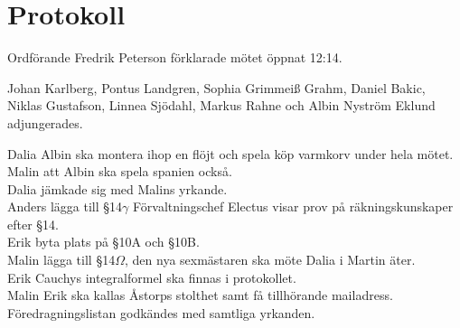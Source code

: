 \documentclass[10pt]{article}
\def\mo{Fredrik Peterson}
\begin{document}
\section*{Protokoll}
\begin{paragrafer}
Ordförande {\mo} förklarade mötet öppnat 12:14.

{\valavmo}

{\valavms}

{\tosg}

Johan Karlberg, Pontus Landgren, Sophia Grimmei{\ss} Grahm, Daniel Bakic, Niklas Gustafson, Linnea Sjödahl, Markus Rahne och Albin Nyström Eklund adjungerades.


{\valavj}

Dalia \ypa Albin ska montera ihop en flöjt och spela köp varmkorv under hela mötet.\\
Malin \ypa att Albin ska spela spanien också.\\
Dalia jämkade sig med Malins yrkande.\\
Anders \ypa lägga till \S14$\gamma$ Förvaltningschef Electus visar prov på räkningskunskaper efter \S14. \\
Erik \ypa byta plats på \S10A och \S10B. \\
Malin \ypa lägga till \S14$\Omega$, den nya sexmästaren ska möte Dalia i Martin äter.\\
Erik \ypa Cauchys integralformel ska finnas i protokollet.\\
Malin \ypa Erik ska kallas Åstorps stolthet samt få tillhörande mailadress.\\
Föredragningslistan godkändes med samtliga yrkanden.

\begin{fyllnadsval} %
\end{fyllnadsval}


\end{paragrafer}
\end{document}
